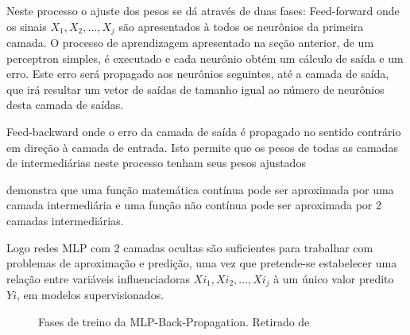 \documentclass[	12pt, Times, openright, twoside, a4paper, english, brazil]{abntex2}
\begin{document}
  	       Neste processo o ajuste dos pesos se dá através de duas fases:
  	       Feed-forward onde os sinais $X_1,X_2,...,X_j$ são apresentados à todos os neurônios da primeira camada. O processo de aprendizagem apresentado na seção anterior, de um perceptron simples, é executado e cada neurônio obtém um cálculo de saída e um erro. Este erro será propagado aos neurônios seguintes, até a camada de saída, que irá resultar um vetor de saídas de tamanho igual ao número de neurônios desta camada de saídas.
  	       
  	       Feed-backward onde o erro da camada de saída é propagado no sentido contrário em direção à camada de entrada. Isto permite que os pesos de todas as camadas de intermediárias neste processo tenham seus pesos ajustados
  	       
  	       \cite{Cybenko1988} demonstra que uma função matemática contínua pode ser aproximada por uma camada intermediária e uma função não contínua pode ser aproximada por 2 camadas intermediárias.
  	       
  	       Logo redes MLP com 2 camadas ocultas são suficientes para trabalhar com problemas de aproximação e predição, uma vez que pretende-se estabelecer uma relação entre variáveis influenciadoras $Xi_1,Xi_2,...,Xi_j$ à um único valor predito $Yi$, em modelos supervisionados.
  	         	       
  	       \begin{figure}[!ht]
  	       	\caption{Fases de treino da MLP-Back-Propagation. Retirado de \cite{Almeida2013}\label{fig:MLP}}
  	       \end{figure}
  	       
\end{document}
